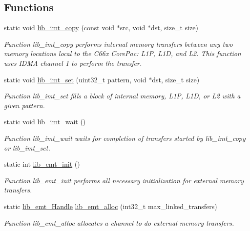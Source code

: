 \subsection*{Functions}
\begin{DoxyCompactItemize}
\item 
static void \hyperlink{group__libarch__memtrans_ga0e8d22819c818e39a2bae0ea24bb567b}{lib\+\_\+imt\+\_\+copy} (const void $\ast$src, void $\ast$dst, size\+\_\+t size)
\begin{DoxyCompactList}\small\item\em Function lib\+\_\+imt\+\_\+copy performs internal memory transfers between any two memory locations local to the C66x Core\+Pac\+: L1\+P, L1\+D, and L2. This function uses I\+D\+M\+A channel 1 to perform the transfer. \end{DoxyCompactList}\item 
static void \hyperlink{group__libarch__memtrans_ga8189ff38ebc25a3700ab04ffb612b1f2}{lib\+\_\+imt\+\_\+set} (uint32\+\_\+t pattern, void $\ast$dst, size\+\_\+t size)
\begin{DoxyCompactList}\small\item\em Function lib\+\_\+imt\+\_\+set fills a block of internal memory, L1\+P, L1\+D, or L2 with a given pattern. \end{DoxyCompactList}\item 
static void \hyperlink{group__libarch__memtrans_ga320847c84fb1dd50ce67a1f5c5315043}{lib\+\_\+imt\+\_\+wait} ()
\begin{DoxyCompactList}\small\item\em Function lib\+\_\+imt\+\_\+wait waits for completion of transfers started by lib\+\_\+imt\+\_\+copy or lib\+\_\+imt\+\_\+set. \end{DoxyCompactList}\item 
static int \hyperlink{group__libarch__memtrans_ga40fa4887611b6ceb4d57b9804d6b26fb}{lib\+\_\+emt\+\_\+init} ()
\begin{DoxyCompactList}\small\item\em Function lib\+\_\+emt\+\_\+init performs all necessary initialization for external memory transfers. \end{DoxyCompactList}\item 
static \hyperlink{group__libarch__memtrans_ga3ee110c7c5d95cfe386b113d2d078ec3}{lib\+\_\+emt\+\_\+\+Handle} \hyperlink{group__libarch__memtrans_ga2d74d954ddeabe505cdc1caf5fc775bc}{lib\+\_\+emt\+\_\+alloc} (int32\+\_\+t max\+\_\+linked\+\_\+transfers)
\begin{DoxyCompactList}\small\item\em Function lib\+\_\+emt\+\_\+alloc allocates a channel to do external memory transfers. \end{DoxyCompactList}\item 

\end{DoxyCompactItemize}
